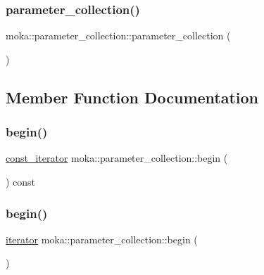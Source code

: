 \mbox{\label{classmoka_1_1parameter__collection_a95759ce039eba581957b9f87bc163000}} 
\subsubsection{\texorpdfstring{parameter\_collection()}{parameter\_collection()}\hspace{0.1cm}{\footnotesize\ttfamily [4/4]}}
{\footnotesize\ttfamily moka\+::parameter\+\_\+collection\+::parameter\+\_\+collection (\begin{DoxyParamCaption}{ }\end{DoxyParamCaption})}



\subsection{Member Function Documentation}
\mbox{\label{classmoka_1_1parameter__collection_a0dad35309be55314f72215c04fff209b}} 
\subsubsection{\texorpdfstring{begin()}{begin()}\hspace{0.1cm}{\footnotesize\ttfamily [1/2]}}
{\footnotesize\ttfamily \mbox{\hyperlink{classmoka_1_1parameter__collection_a6d2ad87d4e43742300cb9ded3beee731}{const\+\_\+iterator}} moka\+::parameter\+\_\+collection\+::begin (\begin{DoxyParamCaption}{ }\end{DoxyParamCaption}) const}

\mbox{\label{classmoka_1_1parameter__collection_a5bd7e953bcc4a075aea8299b16f9f40a}} 
\subsubsection{\texorpdfstring{begin()}{begin()}\hspace{0.1cm}{\footnotesize\ttfamily [2/2]}}
{\footnotesize\ttfamily \mbox{\hyperlink{classmoka_1_1parameter__collection_a2ec8bed3c1d7de9e5c2199ede27aa919}{iterator}} moka\+::parameter\+\_\+collection\+::begin (\begin{DoxyParamCaption}{ }\end{DoxyParamCaption})}

